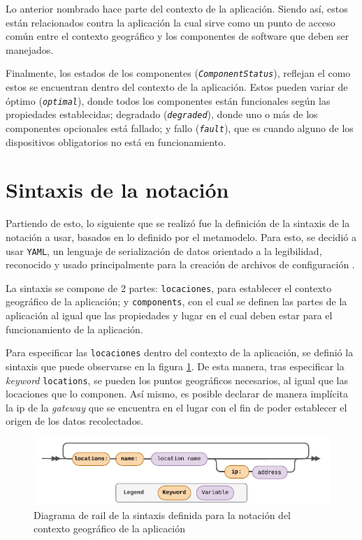 Lo anterior nombrado hace parte del contexto de la aplicación. Siendo así, estos están relacionados contra la aplicación la cual sirve como un punto de acceso común entre el contexto geográfico y los componentes de software que deben ser manejados.

Finalmente, los estados de los componentes (\textit{\texttt{ComponentStatus}}), reflejan el como estos se encuentran dentro del contexto de la aplicación. Estos pueden variar de óptimo (\textit{\texttt{optimal}}), donde todos los componentes están funcionales según las propiedades establecidas; degradado (\textit{\texttt{degraded}}), donde uno o más de los componentes opcionales está fallado; y fallo (\textit{\texttt{fault}}), que es cuando alguno de los dispositivos obligatorios no está en funcionamiento.

\section{Sintaxis de la notación}

Partiendo de esto, lo siguiente que se realizó fue la definición de la sintaxis de la notación a usar, basados en lo definido por el metamodelo. Para esto, se decidió a usar \texttt{YAML}, un lenguaje de serialización de datos orientado a la legibilidad, reconocido y usado principalmente para la creación de archivos de configuración \cite{YAML2023}. 

La sintaxis se compone de 2 partes: \texttt{locaciones}, para establecer el contexto geográfico de la aplicación; y \texttt{components}, con el cual se definen las partes de la aplicación al igual que las propiedades y lugar en el cual deben estar para el funcionamiento de la aplicación.

Para especificar las \texttt{locaciones} dentro del contexto de la aplicación, se definió la sintaxis que puede observarse en la figura \ref{fig:rail-location}. De esta manera, tras especificar la \textit{keyword} \texttt{locations}, se pueden los puntos geográficos necesarios, al igual que las locaciones que lo componen. Así mismo, es posible declarar de manera implícita la ip de la \textit{gateway} que se encuentra en el lugar con el fin de poder establecer el origen de los datos recolectados. 

\begin{figure}[H]
    \centering
    \caption{Diagrama de rail de la sintaxis definida para la notación del contexto geográfico de la aplicación}
    \label{fig:rail-location}
    \vspace{2mm}
    \includegraphics[width=\linewidth]{images/Railroad Locations.pdf}
\end{figure}

